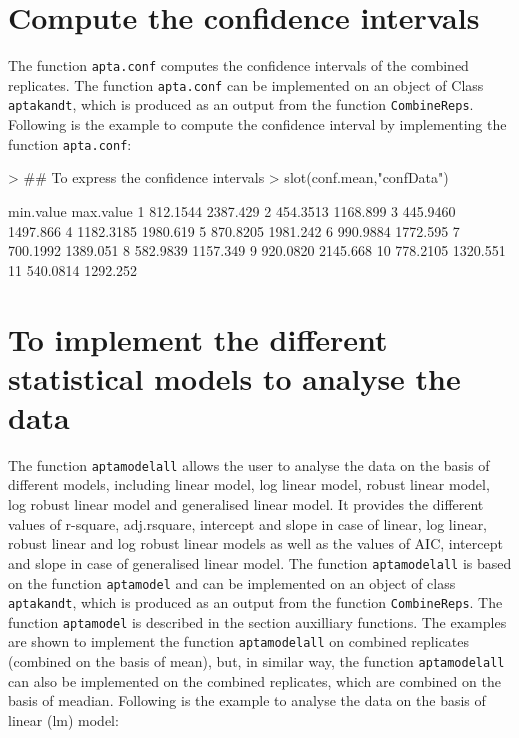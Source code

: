 \documentclass[11pt]{article}
\newcommand{\code}[1]{{\tt #1}}
\begin{document}
\section{Compute the confidence intervals}
The function \code{apta.conf} computes the confidence intervals of the combined replicates. The function \code{apta.conf} can be implemented on an object of Class \code{aptakandt}, which is produced as an output from the function \code{CombineReps}. Following is the example to compute the confidence interval by implementing the function \code{apta.conf}:

\begin{Schunk}
\end{Schunk}

\begin{Schunk}
\begin{Sinput}
> ## To express the confidence intervals
> slot(conf.mean,"confData")
\end{Sinput}
\begin{Soutput}
   min.value max.value
1   812.1544  2387.429
2   454.3513  1168.899
3   445.9460  1497.866
4  1182.3185  1980.619
5   870.8205  1981.242
6   990.9884  1772.595
7   700.1992  1389.051
8   582.9839  1157.349
9   920.0820  2145.668
10  778.2105  1320.551
11  540.0814  1292.252
\end{Soutput}
\end{Schunk}

\section{To implement the different statistical models to analyse the data}
The function \code{aptamodelall} allows the user to analyse the data on the basis of different
models, including linear model, log linear model, robust linear model, log robust linear model
and generalised linear model. It provides the different values of r-square, adj.rsquare, intercept
and slope in case of linear, log linear, robust linear and log robust linear models as well as the
values of AIC, intercept and slope in case of generalised linear model. The function
\code{aptamodelall} is based on the function \code{aptamodel} and can be implemented on
an object of class \code{aptakandt}, which is produced as an output from the function \code{CombineReps}. The function \code{aptamodel} is described in the section auxilliary functions. The examples are shown to implement the function \code{aptamodelall} on combined replicates (combined on the basis of mean), but, in similar way, the function \code{aptamodelall} can also be implemented on the combined replicates, which are combined on the basis of meadian. Following is the example to analyse the data on the basis of linear (lm) model:
\end{document}

